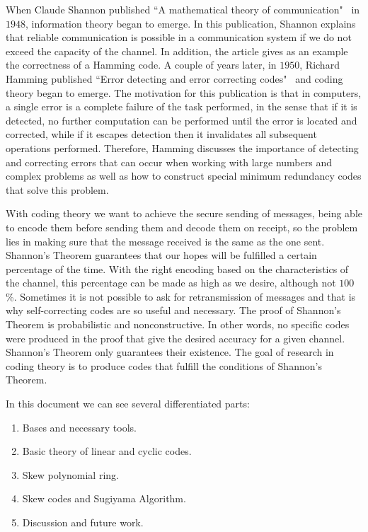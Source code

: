 
When Claude Shannon published ``A mathematical theory of communication"\ \cite{Shannon} in $1948$, information theory began to emerge. In this publication, Shannon explains that reliable communication is possible in a communication system if we do not exceed the capacity of the channel. In addition, the article gives as an example the correctness of a Hamming code. A couple of years later, in $1950$, Richard Hamming published ``Error detecting and error correcting codes"\ \cite{Hamming} and coding theory began to emerge. The motivation for this publication is that in computers, a single error is a complete failure of the task performed, in the sense that if it is detected, no further computation can be performed until the error is located and corrected, while if it escapes detection then it invalidates all subsequent operations performed. Therefore, Hamming discusses the importance of detecting and correcting errors that can occur when working with large numbers and complex problems as well as how to construct special minimum redundancy codes that solve this problem.

With coding theory we want to achieve the secure sending of messages, being able to encode them before sending them and decode them on receipt, so the problem lies in making sure that the message received is the same as the one sent. Shannon’s Theorem guarantees that our
hopes will be fulfilled a certain percentage of the time. With the right encoding based on the characteristics of the channel, this percentage can be made as high as we desire, although not $100$\%. Sometimes it is not possible to ask for retransmission of messages and that is why self-correcting codes are so useful and necessary. The proof of Shannon’s Theorem is probabilistic and nonconstructive. In other words, no specific codes were produced in the proof that give the desired accuracy for a given channel. Shannon’s Theorem only guarantees their existence. The goal of research in coding theory is to produce codes that fulfill the conditions of Shannon’s Theorem. \cite{Huffman_Pless_2010}




In this document we can see several differentiated parts:

\begin{enumerate}
    \item Bases and necessary tools.
    \item Basic theory of linear and cyclic codes.
    \item Skew polynomial ring.
    \item Skew codes and Sugiyama Algorithm.
    \item Discussion and future work.
\end{enumerate}

